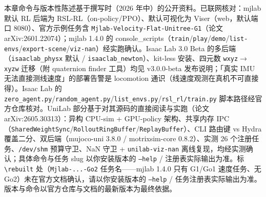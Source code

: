 \begin{finenote}
本章命令与版本性陈述基于撰写时（2026 年中）的公开资料。已联网核对：mjlab 默认 RL 后端为 RSL-RL（on-policy/PPO）、默认可视化为 Viser（web，默认端口 8080）、官方示例任务含 \texttt{Mjlab-Velocity-Flat-Unitree-G1}（论文 arXiv:2601.22074）；mjlab 1.4.0 的 console\_scripts（\texttt{train}/\texttt{play}/\texttt{demo}/\texttt{list-envs}/\texttt{export-scene}/\texttt{viz-nan}）经实跑确认。Isaac Lab 3.0 Beta 的多后端（\texttt{isaaclab\_physx} 默认 / \texttt{isaaclab\_newton}）、kit-less 安装、四元数 \texttt{wxyz}$\to$\texttt{xyzw} 迁移（附 quaternion finder 工具）均见 v3.0.0-beta 发布说明；「真实 IMU 无法直接测线速度」的部署告警是 locomotion 通识（线速度观测在真机不可直接得）。Isaac Lab 的 \texttt{zero\_agent.py}/\texttt{random\_agent.py}/\texttt{list\_envs.py}/\texttt{rsl\_rl/train.py} 脚本路径经官方仓库核对。UniLab 部分基于对其源码的直接阅读与实跑（论文 arXiv:2605.30313）：异构 CPU-sim + GPU-policy 架构、共享内存 IPC（\texttt{SharedWeightSync}/\texttt{RolloutRingBuffer}/\texttt{ReplayBuffer}）、CLI 路由键 vs Hydra 覆盖二分、双后端（mujoco-uni 3.8.0 / motrixsim-core 0.8.2）、实测 26 个注册任务、\texttt{/dev/shm} 预算守卫、NaN 守卫 + \texttt{unilab-viz-nan} 离线复现，均经实测确认；具体命令与任务 slug 以你安装版本的 \texttt{--help} / 注册表实际输出为准。标 \texttt{\textbackslash rebuilt} 处（\texttt{Mjlab-...-Go2} 任务名——mjlab 1.4.0 只有 G1/Go1 速度任务、无 Go2）未在官方文档确认，请以你安装版本的 \texttt{--help} / 任务注册表实际输出为准。版本与命令以官方仓库与文档的最新版本为最终依据。
\end{finenote}

